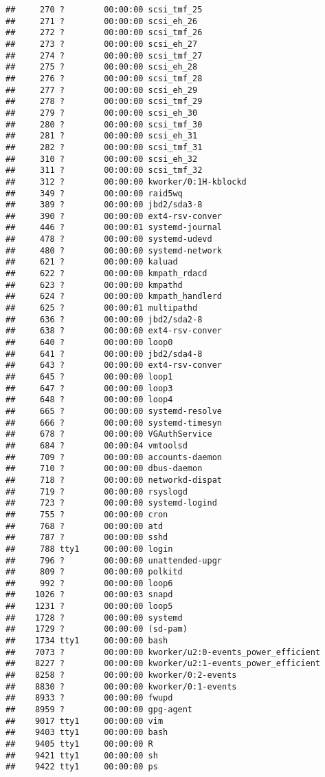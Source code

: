 \documentclass[]{article}
\begin{document}
\begin{verbatim}
##     270 ?        00:00:00 scsi_tmf_25
##     271 ?        00:00:00 scsi_eh_26
##     272 ?        00:00:00 scsi_tmf_26
##     273 ?        00:00:00 scsi_eh_27
##     274 ?        00:00:00 scsi_tmf_27
##     275 ?        00:00:00 scsi_eh_28
##     276 ?        00:00:00 scsi_tmf_28
##     277 ?        00:00:00 scsi_eh_29
##     278 ?        00:00:00 scsi_tmf_29
##     279 ?        00:00:00 scsi_eh_30
##     280 ?        00:00:00 scsi_tmf_30
##     281 ?        00:00:00 scsi_eh_31
##     282 ?        00:00:00 scsi_tmf_31
##     310 ?        00:00:00 scsi_eh_32
##     311 ?        00:00:00 scsi_tmf_32
##     312 ?        00:00:00 kworker/0:1H-kblockd
##     349 ?        00:00:00 raid5wq
##     389 ?        00:00:00 jbd2/sda3-8
##     390 ?        00:00:00 ext4-rsv-conver
##     446 ?        00:00:01 systemd-journal
##     478 ?        00:00:00 systemd-udevd
##     480 ?        00:00:00 systemd-network
##     621 ?        00:00:00 kaluad
##     622 ?        00:00:00 kmpath_rdacd
##     623 ?        00:00:00 kmpathd
##     624 ?        00:00:00 kmpath_handlerd
##     625 ?        00:00:01 multipathd
##     636 ?        00:00:00 jbd2/sda2-8
##     638 ?        00:00:00 ext4-rsv-conver
##     640 ?        00:00:00 loop0
##     641 ?        00:00:00 jbd2/sda4-8
##     643 ?        00:00:00 ext4-rsv-conver
##     645 ?        00:00:00 loop1
##     647 ?        00:00:00 loop3
##     648 ?        00:00:00 loop4
##     665 ?        00:00:00 systemd-resolve
##     666 ?        00:00:00 systemd-timesyn
##     678 ?        00:00:00 VGAuthService
##     684 ?        00:00:04 vmtoolsd
##     709 ?        00:00:00 accounts-daemon
##     710 ?        00:00:00 dbus-daemon
##     718 ?        00:00:00 networkd-dispat
##     719 ?        00:00:00 rsyslogd
##     723 ?        00:00:00 systemd-logind
##     755 ?        00:00:00 cron
##     768 ?        00:00:00 atd
##     787 ?        00:00:00 sshd
##     788 tty1     00:00:00 login
##     796 ?        00:00:00 unattended-upgr
##     809 ?        00:00:00 polkitd
##     992 ?        00:00:00 loop6
##    1026 ?        00:00:03 snapd
##    1231 ?        00:00:00 loop5
##    1728 ?        00:00:00 systemd
##    1729 ?        00:00:00 (sd-pam)
##    1734 tty1     00:00:00 bash
##    7073 ?        00:00:00 kworker/u2:0-events_power_efficient
##    8227 ?        00:00:00 kworker/u2:1-events_power_efficient
##    8258 ?        00:00:00 kworker/0:2-events
##    8830 ?        00:00:00 kworker/0:1-events
##    8933 ?        00:00:00 fwupd
##    8959 ?        00:00:00 gpg-agent
##    9017 tty1     00:00:00 vim
##    9403 tty1     00:00:00 bash
##    9405 tty1     00:00:00 R
##    9421 tty1     00:00:00 sh
##    9422 tty1     00:00:00 ps
\end{verbatim}
\end{document}
